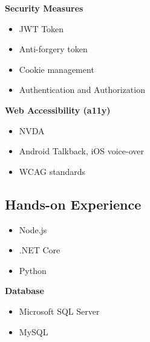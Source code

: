 \documentclass[letterpaper]{deedy-resume} %
\begin{document}
\begin{minipage}[t]{0.33\textwidth}
\vspace{-\topsep}


\textbf{Security Measures}
\vspace{-\topsep}

\begin{itemize}
\setlength\itemsep{-0.5em} %
\item JWT Token
\item Anti-forgery token
\item Cookie management
\item Authentication and Authorization
\end{itemize}


\vspace{-\topsep}

\textbf{Web Accessibility (a11y)}
\vspace{-\topsep}

\begin{itemize}
\setlength\itemsep{-0.5em} %
\item NVDA
\item Android Talkback, iOS voice-over
\item WCAG standards
\end{itemize}




\subsection{Hands-on Experience}

\begin{itemize}
\setlength\itemsep{-0.5em} %
\item Node.js
\item .NET Core
\item Python
\end{itemize}



\vspace{-\topsep}


\textbf{Database}
\vspace{-\topsep}
\begin{itemize}
\setlength\itemsep{-0.5em} %
\item Microsoft SQL Server
\item MySQL
\end{itemize}




\end{minipage}
\end{document}
